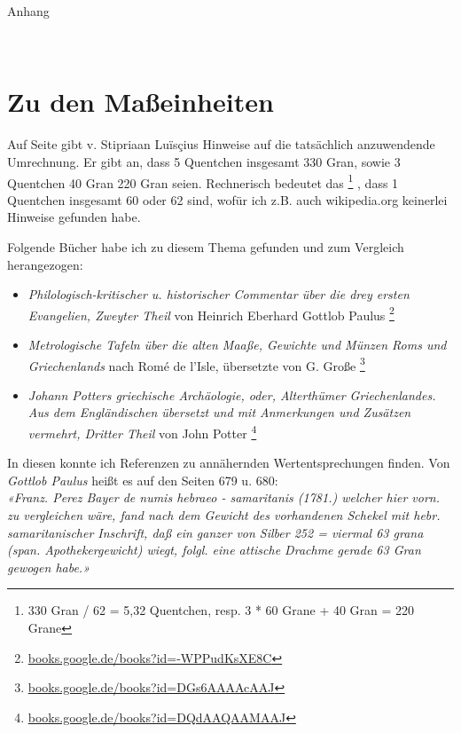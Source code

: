 \documentclass[a5paper,fontsize=10pt]{memoir}
\begin{document}
{\centering
{\Large Anhang}
\vspace{2em}

\begin{minipage}{4cm}
  \hrulefill\\
\end{minipage}

}

\section{Zu den Maßeinheiten}

Auf Seite \pageref{units_value_page} gibt
v. Stipriaan Luïsçius
Hinweise auf die tatsächlich anzuwendende Umrechnung.
Er gibt an,
dass 5  Quentchen insgesamt 330 Gran,
sowie 3 Quentchen 40 Gran 220 Gran seien.
Rechnerisch bedeutet das%
\footnote{330 Gran / 62 = 5,32 Quentchen,
resp. 3 * 60 Grane + 40 Gran = 220 Grane}%
, dass 1 Quentchen insgesamt 60 oder 62 sind,
wofür ich z.B. auch wikipedia.org keinerlei Hinweise gefunden habe.

Folgende Bücher habe ich zu diesem Thema gefunden
und zum Vergleich herangezogen:
\begin{itemize}
\item \emph{Philologisch-kritischer u. historischer Commentar
über die drey ersten Evangelien, Zweyter Theil}
von Heinrich Eberhard Gottlob Paulus%
\footnote{\href{https://books.google.de/books?id=-WPPudKsXE8C}
{books.google.de/books?id=-WPPudKsXE8C}}
\item \emph{Metrologische Tafeln über die alten Maaße,
Gewichte und Münzen Roms und Griechenlands}
nach Romé de l'Isle,
übersetzte von G. Große%
\footnote{\href{https://books.google.de/books?id=DGs6AAAAcAAJ}
{books.google.de/books?id=DGs6AAAAcAAJ}}
\item \emph{Johann Potters griechische Archäologie,
oder, Alterthümer Griechenlandes.
Aus dem Engländischen übersetzt
und mit Anmerkungen und Zusätzen vermehrt, Dritter Theil}
von John Potter%
\footnote{\href{https://books.google.de/books?id=DQdAAQAAMAAJ}{books.google.de/books?id=DQdAAQAAMAAJ}}
\end{itemize}
In diesen konnte ich Referenzen zu annähernden Wertentsprechungen finden.
Von \emph{Gottlob Paulus} heißt es auf den Seiten 679 u. 680:\\

\emph{«Franz. Perez Bayer de numis hebraeo - samaritanis (1781.)
welcher hier vorn. zu vergleichen wäre,
fand nach dem Gewicht des vorhandenen Schekel
mit hebr. samaritanischer Inschrift,
daß ein ganzer von Silber
252 = viermal 63 grana (span. Apothekergewicht) wiegt,
folgl. eine attische Drachme gerade 63 Gran gewogen habe.»}\\
\end{document}
